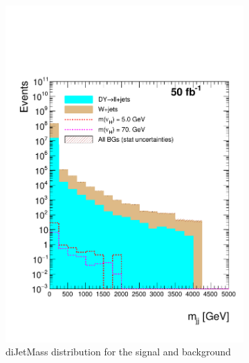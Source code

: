 \begin{figure}[h]
\begin{subfigure}{.5\textwidth}
  \includegraphics[width=1.1\linewidth]{./Capitulos/Analysis/AfterBJets/mjj_MET_20}
  \caption{diJetMass distribution for the signal and background}
  \label{diJetMass_bjets}
\end{subfigure}
\begin{subfigure}{.5\textwidth}
  \centering

\end{subfigure}
\end{figure}
